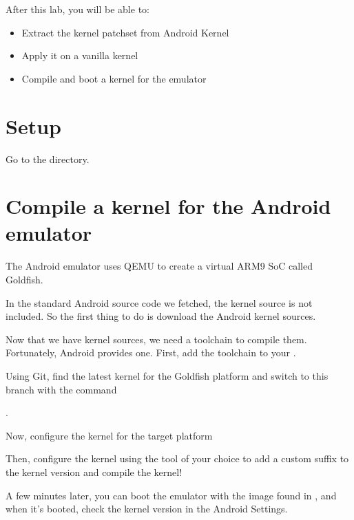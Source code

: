 
After this lab, you will be able to:
\begin{itemize}
  \item Extract the kernel patchset from Android Kernel
  \item Apply it on a vanilla kernel
  \item Compile and boot a kernel for the emulator
\end{itemize}

\section{Setup}

Go to the  directory.

\section{Compile a kernel for the Android emulator}

The Android emulator uses QEMU to create a virtual ARM9 SoC called Goldfish.

In the standard Android source code we fetched, the kernel source is not included.
So the first thing to do is download the Android kernel sources.


Now that we have kernel sources, we need a toolchain to compile them. Fortunately,
Android provides one. First, add the toolchain to your .


Using Git, find the latest kernel for the Goldfish platform
and switch to this branch with the command 

.

Now, configure the kernel for the target platform


Then, configure the kernel using the tool of your choice to add a custom suffix
to the kernel version and compile the kernel!


A few minutes later, you can boot the emulator with the image found in
, and when it's booted, check the kernel version in the
Android Settings.

